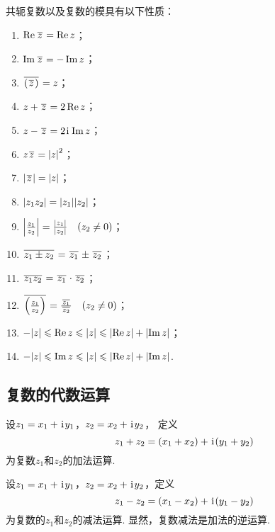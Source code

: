 \begin{property}
共轭复数以及复数的模具有以下性质：
\begin{enumerate}
\item \(\Re \kern1pt\overline{z}\kern1pt = \Re z\)；
\item \(\Im \kern1pt\overline{z}\kern1pt = -\Im z\)；
\item \(\kern1pt\overline{(\kern1pt\overline{z}\kern1pt)}\kern1pt = z\)；
\item \(z+\kern1pt\overline{z}\kern1pt = 2 \Re z\)；
\item \(z-\kern1pt\overline{z}\kern1pt = 2\kern1pt\mathrm{i}\kern1pt \Im z\)；
\item \(z\kern1pt\overline{z}\kern1pt = \abs{z}^2\)；
\item \(\abs{\kern1pt\overline{z}\kern1pt}=\abs{z}\)；
\item \(\abs{z_1 z_2} = \abs{z_1} \abs{z_2}\)；
\item \(\abs{\frac{z_1}{z_2}} = \frac{\abs{z_1}}{\abs{z_2}} \quad(z_2 \neq 0)\)；
\item \(\kern1pt\overline{z_1 \pm z_2}\kern1pt = \kern1pt\overline{z_1}\kern1pt \pm \kern1pt\overline{z_2}\kern1pt\)；
\item \(\kern1pt\overline{z_1 z_2}\kern1pt = \kern1pt\overline{z_1}\kern1pt \cdot \kern1pt\overline{z_2}\kern1pt\)；
\item \(\kern1pt\overline{\left(\frac{z_1}{z_2}\right)}\kern1pt = \frac{\kern1pt\overline{z_1}\kern1pt}{\kern1pt\overline{z_2}\kern1pt} \quad (z_2 \neq 0)\)；
\item \(-\abs{z} \leqslant \Re z \leqslant \abs{z} \leqslant \abs{\Re z} + \abs{\Im z}\)；
\item \(-\abs{z} \leqslant \Im z \leqslant \abs{z} \leqslant \abs{\Re z} + \abs{\Im z}\).
\end{enumerate}
\end{property}

\subsection{复数的代数运算}
\begin{definition}[复数加法]
设\(z_1=x_1+\kern1pt\mathrm{i}\kern1pt y_1\)，\(z_2=x_2+\kern1pt\mathrm{i}\kern1pt y_2\)，%
定义\[
z_1+z_2=(x_1+x_2)+\kern1pt\mathrm{i}\kern1pt(y_1+y_2)
\]为复数\(z_1\)和\(z_2\)的加法运算.
\end{definition}

\begin{definition}[复数减法]
设\(z_1=x_1+\kern1pt\mathrm{i}\kern1pt y_1\)，\(z_2=x_2+\kern1pt\mathrm{i}\kern1pt y_2\)，定义\[
z_1-z_2=(x_1-x_2)+\kern1pt\mathrm{i}\kern1pt(y_1-y_2)
\]为复数的\(z_1\)和\(z_2\)的减法运算.
显然，复数减法是加法的逆运算.
\end{definition}


